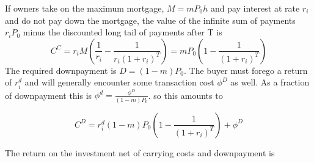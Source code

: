 If  owners take on the maximum mortgage, $M=mP_0h$ and pay interest at rate $r_i$ %
and do not pay down the mortgage, the value of the infinite sum of payments $ r_iP_0$  minus the discounted long tail of payments after T is 
\[C^C= r_iM\left(\frac{1}{r_i} - \frac{1}{r_i(1+r_i)^T}\right)= mP_0\left(1- \frac{1}{(1+r_i)^T}\right) \]%
The required downpayment is $D=(1-m)P_0$. The buyer must forego a return of $r_i^d$ and will generally encounter some transaction cost $\phi^D$ as well. As a fraction of downpayment this is  $\phi^d=\frac{\phi^D}{(1-m)P_0}$.   so this amounts to

 \[C^D=  r_i^d(1-m)P_0\left(1- \frac{1}{(1+r_i)^T}  \right)  + \phi^D  \]

The return on the investment net of carrying costs and downpayment is 

